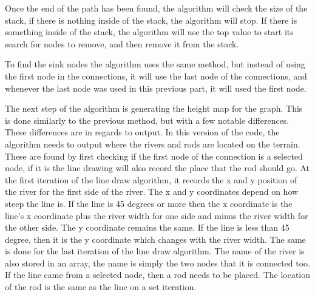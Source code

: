 	\newline
	\par
	Once the end of the path has been found, the algorithm will check the size of the stack, if there is nothing inside of the stack, the algorithm will stop. If there is something inside of the stack, the algorithm will use the top value to start its search for nodes to remove, and then remove it from the stack.
	\newline
	\par
	To find the sink nodes the algorithm uses the same method, but instead of using the first node in the connections, it will use the last node of the connections, and whenever the last node was used in this previous part, it will used the first node.
	\newline
	\par
	

	The next step of the algorithm is generating the height map for the graph. This is done similarly to the previous method, but with a few notable differences. These differences are in regards to output. In this version of the code, the algorithm needs to output where the rivers and rods are located on the terrain. These are found by first checking if the first node of the connection is a selected node, if it is the line drawing will also record the place that the rod should go. At the first iteration of the line draw algorithm, it records the x and y position of the river for the first side of the river. The x and y coordinates depend on how steep the line is. If the line is 45 degrees or more then the x coordinate is the line's x coordinate plus the river width for one side and minus the river width for the other side. The y coordinate remains the same. If the line is less than 45 degree, then it is the y coordinate which changes with the river width. The same is done for the last iteration of the line draw algorithm. The name of the river is also stored in an array, the name is simply the two nodes that it is connected too. If the line came from a selected node, then a rod needs to be placed. The location of the rod is the same as the line on a set iteration.
	\newline
	\par



